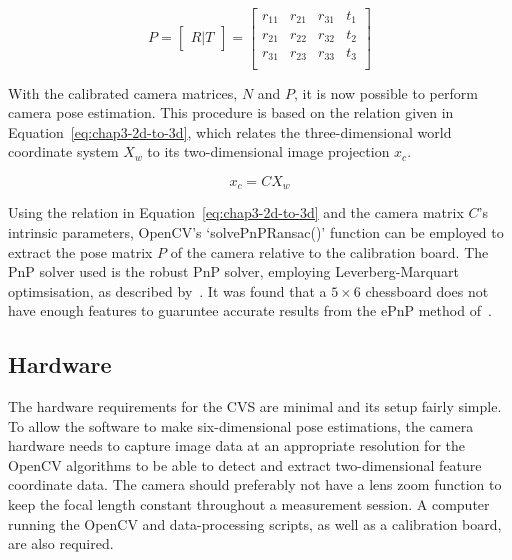 \begin{equation}
  \label{eq:chap3-cam-extrinsic}
  P = 
  \begin{bmatrix}
    R | T
  \end{bmatrix}
  =
  \begin{bmatrix}
    r_{11} & r_{21} & r_{31} & t_1 \\
    r_{21} & r_{22} & r_{32} & t_2 \\
    r_{31} & r_{23} & r_{33} & t_3 \\
  \end{bmatrix}
\end{equation}

With the calibrated camera matrices, $N$ and $P$, it is now possible to perform camera pose estimation. This procedure is based on the relation given in Equation~\ref{eq:chap3-2d-to-3d}, which relates the three-dimensional world coordinate system $X_w$ to its two-dimensional image projection $x_c$.  

\begin{equation}
   \label{eq:chap3-2d-to-3d}
   x_c
   = C
   X_w
\end{equation}

Using the relation in Equation~\ref{eq:chap3-2d-to-3d} and the camera matrix $C$'s intrinsic parameters, OpenCV's `solvePnPRansac()' function can be employed to extract the pose matrix $P$ of the camera relative to the calibration board. The PnP solver used is the robust PnP solver, employing Leverberg-Marquart optimsisation, as described by~\cite{schweighofer2006robust}. It was found that a $5\times6$ chessboard does not have enough features to guaruntee accurate results from the ePnP method of~\cite{lepetit2009epnp}.

\subsection{Hardware}

The hardware requirements for the CVS are minimal and its setup fairly simple. To allow the software to make six-dimensional pose estimations, the camera hardware needs to capture image data at an appropriate resolution for the OpenCV algorithms to be able to detect and extract two-dimensional feature coordinate data. The camera should preferably not have a lens zoom function to keep the focal length constant throughout a measurement session. A computer running the OpenCV and data-processing scripts, as well as a calibration board, are also required. 

